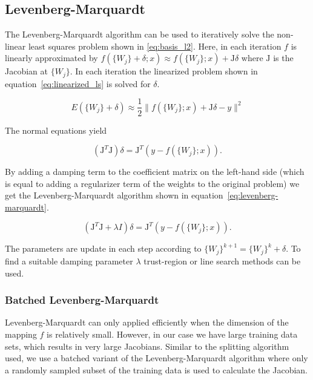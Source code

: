 \documentclass[english,11pt,a4paper]{article}
\begin{document}
\subsection{Levenberg-Marquardt}

The Levenberg-Marquardt algorithm can be used to iteratively solve the non-linear least squares problem shown in \ref{eq:basis_l2}. Here, in each iteration $f$ is linearly approximated by $f(\{W_j\}+\delta;x) \approx f(\{W_j\};x) + \mathrm{J}\delta$ where $\mathrm{J}$ is the Jacobian at $\{W_j\}$. In each iteration the linearized problem shown in equation~\ref{eq:linearized_ls} is solved for $\delta$.

\begin{equation}
	E(\{W_j\}+\delta) \approx \frac{1}{2} \|f(\{W_j\};x) + \mathrm{J}\delta - y\|^2
	\label{eq:linearized_ls}
\end{equation}

The normal equations yield

\begin{equation}
	(\mathrm{J}^T \mathrm{J}) \delta = \mathrm{J}^T(y - f(\{W_j\};x)).
\end{equation}

By adding a damping term to the coefficient matrix on the left-hand side (which is equal to adding a regularizer term of the weights to the original problem) we get the Levenberg-Marquardt algorithm shown in equation~\ref{eq:levenberg-marquardt}.

\begin{equation}
	(\mathrm{J}^T \mathrm{J} + \lambda I) \delta = \mathrm{J}^T(y - f(\{W_j\};x)).
	\label{eq:levenberg-marquardt}
\end{equation}

The parameters are update in each step according to $\{W_j\}^{k+1} = \{W_j\}^k + \delta$. To find a suitable damping parameter $\lambda$ trust-region or line search methods can be used.

\subsubsection{Batched Levenberg-Marquardt}

Levenberg-Marquardt can only applied efficiently when the dimension of the mapping $f$ is relatively small. However, in our case we have large training data sets, which results in very large Jacobians. Similar to the splitting algorithm used, we use a batched variant of the Levenberg-Marquardt algorithm where only a randomly sampled subset of the training data is used to calculate the Jacobian.
\end{document}
